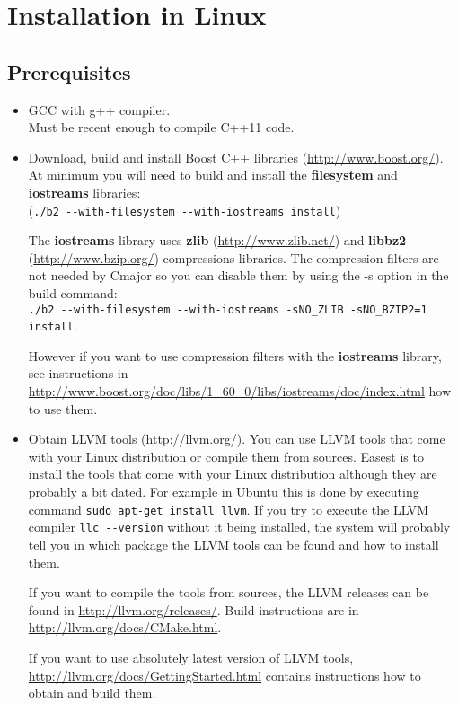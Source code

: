 \documentclass[oneside, a4paper, 11pt]{article}
\begin{document}
\section{Installation in Linux}

\subsection{Prerequisites}

\begin{itemize}

\item
GCC with g++ compiler.\\
Must be recent enough to compile C++11 code.

\item
Download, build and install Boost C++ libraries
(\url{http://www.boost.org/}).
At minimum you will need to build and install the
\textbf{filesystem} and \textbf{iostreams} libraries:\\
(\verb|./b2 --with-filesystem --with-iostreams install|)

The \textbf{iostreams} library uses \textbf{zlib} (\url{http://www.zlib.net/}) and
\textbf{libbz2} (\url{http://www.bzip.org/}) compressions libraries.
The compression filters are not needed by Cmajor so you can disable them by
using the -s option in the build command:\\
\verb|./b2 --with-filesystem --with-iostreams -sNO_ZLIB -sNO_BZIP2=1 install|.

However if you want to use compression filters with the \textbf{iostreams} library,
see instructions in \url{http://www.boost.org/doc/libs/1_60_0/libs/iostreams/doc/index.html}
how to use them.

\item
Obtain LLVM tools (\url{http://llvm.org/}).
You can use LLVM tools that come with your Linux distribution or compile them from sources.
Easest is to install the tools that come with your Linux distribution although they are
probably a bit dated. For example in Ubuntu this is done by executing command
\verb|sudo apt-get install llvm|. If you try to execute the LLVM compiler \verb|llc --version|
without it being installed, the system will probably tell you in which package the LLVM tools
can be found and how to install them.

If you want to compile the tools from sources, the LLVM releases can be found in \url{http://llvm.org/releases/}.
Build instructions are in \url{http://llvm.org/docs/CMake.html}.

If you want to use absolutely latest version of LLVM tools, \url{http://llvm.org/docs/GettingStarted.html}
contains instructions how to obtain and build them.

\end{itemize}
\end{document}
